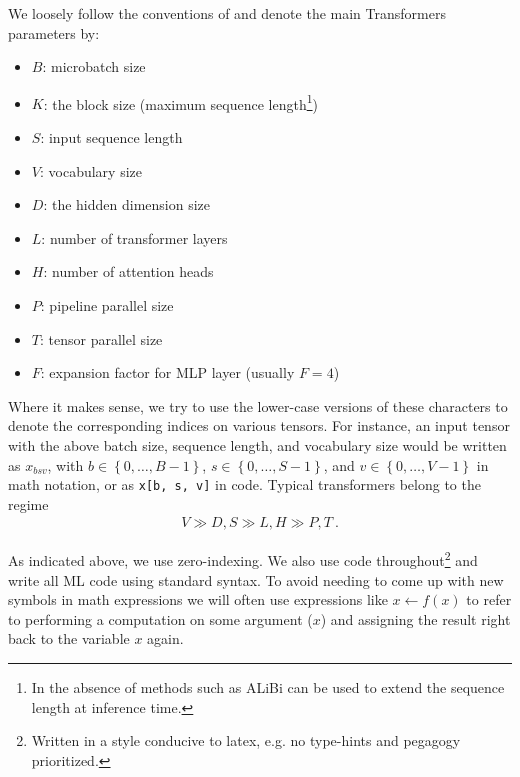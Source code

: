 \documentclass[11pt]{article}
\begin{document}
We loosely follow the conventions of \cite{korthikanti2022reducing} and denote the main Transformers
parameters by:
\begin{itemize}
\item $ B $: microbatch size
\item $ K $: the block size (maximum sequence length\footnote{In the absence of methods such as
    ALiBi \cite{ALiBi}  can be used to extend the sequence length at inference time.})
\item $ S $: input sequence length
\item $ V $: vocabulary size
\item $ D $: the hidden dimension size
\item $ L $: number of transformer layers
\item $ H $: number of attention heads
\item $ P $: pipeline parallel size
\item $ T $: tensor parallel size
\item $ F $: expansion factor for MLP layer (usually $ F=4 $)
\end{itemize}
Where it makes sense, we try to use the lower-case versions of these characters to denote the
corresponding indices on various tensors. For instance, an input tensor with the above batch size,
sequence length, and vocabulary size would be written as $ x _{ bsv } $, with $ b \in \left \{ 0,
\ldots, B - 1 \right \} $, $ s \in \left \{ 0, \ldots, S - 1\right \} $, and $  v \in \left \{ 0,
    \ldots, V -1\right \}$ in math notation, or as \texttt{x[b, s, v]} in code.  Typical
    transformers belong to the regime
\begin{gather}
V \gg D, S \gg L, H \gg P, T \ .  \label{app_eq_transformers_approxs}
\end{gather}


As indicated above,  we use zero-indexing. We also use  code
throughout\footnote{Written in a style conducive to latex, e.g. no type-hints and pegagogy
prioritized.}  and
write all ML code using standard  syntax. To avoid needing to come up with new
symbols in math expressions we will often use expressions like $ x \leftarrow f(x) $ to refer to performing
a computation on some argument ($ x $) and assigning the result right back to the variable $ x $
again.
\end{document}
